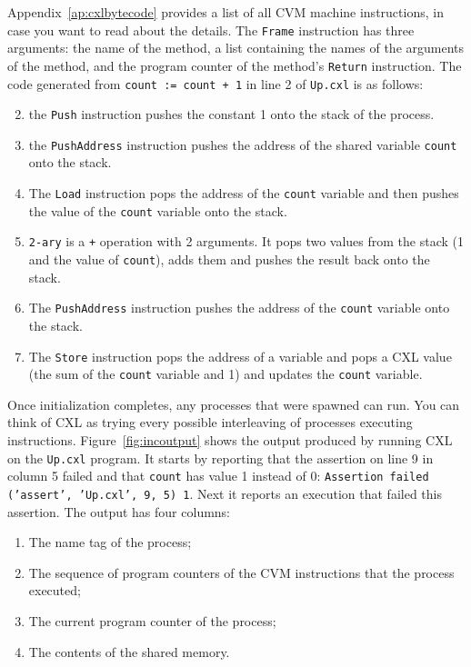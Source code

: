 \documentclass{report}
\begin{document}
Appendix~\ref{ap:cxlbytecode} provides a list of all CVM machine instructions,
in case you want to read about the details.
The \texttt{Frame} instruction has three arguments: the name of the method,
a list containing the names of the arguments of the method, and
the program counter of the method's \texttt{Return} instruction.
The code generated from \texttt{count := count + 1} in line 2 of
\texttt{Up.cxl} is as follows:

\begin{enumerate} \setcounter{enumi}{1}
\item the \texttt{Push} instruction pushes the constant 1
onto the stack of the process.
\item the \texttt{PushAddress} instruction pushes the address of
the shared variable \texttt{count} onto the stack.
\item The \texttt{Load} instruction pops the address of the
\texttt{count} variable and then pushes the value of the
\texttt{count} variable onto the stack.
\item \texttt{2-ary} is a \texttt{+} operation with 2 arguments.
It pops two values from the stack (1 and the value of \texttt{count}),
adds them and pushes the result back onto the stack.
\item The \texttt{PushAddress} instruction pushes the address of the \texttt{count}
variable onto the stack.
\item The \texttt{Store} instruction pops the address of a variable and pops
a CXL value (the sum of the \texttt{count} variable and 1) and updates the
\texttt{count} variable.
\end{enumerate}

Once initialization completes, any processes that were spawned can run.
You can think of CXL as trying every possible interleaving of processes executing
instructions.
Figure~\ref{fig:incoutput} shows the output produced by running CXL on the
\texttt{Up.cxl} program.
It starts by reporting that the assertion on line 9 in column 5 failed and that
\texttt{count} has value 1 instead of 0:
\texttt{Assertion failed (’assert’, ’Up.cxl’, 9, 5) 1}.
Next it reports an execution that failed this assertion.  The output has
four columns:
\begin{enumerate}
\item The name tag of the process;
\item The sequence of program counters of the CVM instructions that the process executed;
\item The current program counter of the process;
\item The contents of the shared memory.
\end{enumerate}
\end{document}
